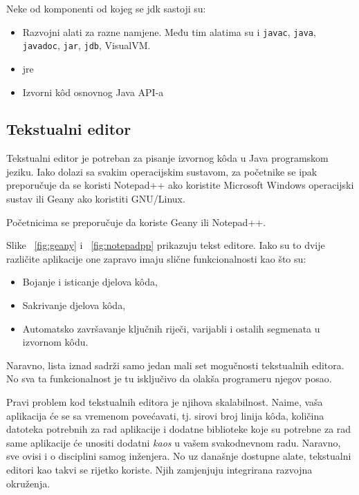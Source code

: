 Neke od komponenti od kojeg se \gls{jdk} sastoji su:

\begin{itemize}
    \item Razvojni alati za razne namjene. Među tim alatima su i \texttt{javac}, \texttt{java}, \texttt{javadoc}, \texttt{jar}, \texttt{jdb}, VisualVM.
    \item \gls{jre}
    \item Izvorni kôd osnovnog Java API-a
\end{itemize}

\subsection{Tekstualni editor}
Tekstualni editor je potreban za pisanje izvornog kôda u Java programskom jeziku. Iako dolazi sa svakim operacijskim sustavom, za početnike se ipak preporučuje da se koristi Notepad++ ako koristite Microsoft Windows operacijski sustav ili Geany ako koristiti GNU/Linux.

\begin{tipbox}
    Početnicima se preporučuje da koriste Geany ili Notepad++.
\end{tipbox}

Slike ~\ref{fig:geany} i ~\ref{fig:notepadpp} prikazuju tekst editore. Iako su to dvije različite aplikacije one zapravo imaju slične funkcionalnosti kao što su:

\begin{itemize}
    \item Bojanje i isticanje djelova kôda,
    \item Sakrivanje djelova kôda,
    \item Automatsko završavanje ključnih riječi, varijabli i ostalih segmenata u izvornom kôdu.
\end{itemize}

Naravno, lista iznad sadrži samo jedan mali set mogučnosti tekstualnih editora. No sva ta funkcionalnost je tu isključivo da olakša programeru njegov posao.

Pravi problem kod tekstualnih editora je njihova skalabilnost. Naime, vaša aplikacija će se sa vremenom povećavati, tj. sirovi broj linija kôda, količina datoteka potrebnih za rad aplikacije i dodatne biblioteke koje su potrebne za rad same aplikacije će unositi dodatni \emph{kaos} u vašem svakodnevnom radu. Naravno, sve ovisi i o disciplini samog inženjera. No uz današnje dostupne alate, tekstualni editori kao takvi se rijetko koriste. Njih zamjenjuju integrirana razvojna okruženja.

